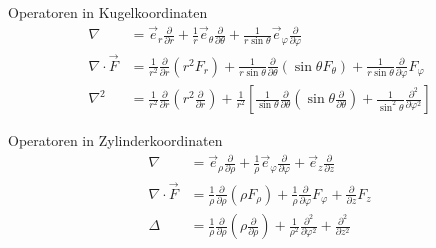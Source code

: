 Operatoren in Kugelkoordinaten
\begin{align*}
	\nabla            & =\vec e_r \frac{\partial}{\partial r}+\frac{1}{r}\vec e_\theta \frac{\partial}{\partial \theta} + \frac{1}{r\sin\theta}\vec e_\varphi \frac{\partial}{\partial\varphi}                                                                                                                    \\
	\nabla\cdot\vec F & = \frac{1}{r^2} \frac{\partial}{\partial r} (r^2 F_r)+ \frac{1}{r \sin\theta} \frac{\partial}{\partial\theta}(\sin\theta F_\theta)+\frac{1}{r\sin\theta} \frac{\partial}{\partial\varphi}F_\varphi                                                                                        \\
	\nabla^2          & =\frac{1}{r^2} \frac{\partial}{\partial r}\left(r^2 \frac{\partial}{\partial r}\right) +\frac{1}{r^2}\left[ \frac{1}{\sin\theta} \frac{\partial}{\partial\theta}\left(\sin\theta \frac{\partial}{\partial\theta}\right)+\frac{1}{\sin^2\theta}\frac{\partial^2}{\partial\varphi^2}\right]
\end{align*}

Operatoren in Zylinderkoordinaten
\begin{align*}
	\nabla             & = \vec e_\rho \frac{\partial}{\partial\rho} + \frac{1}{\rho}\vec e_\varphi \frac{\partial}{\partial\varphi}+\vec e_z \frac{\partial}{\partial z}                                    \\
	\nabla\cdot \vec F & = \frac{1}{\rho} \frac{\partial}{\partial\rho} \left(\rho F_\rho\right) + \frac{1}{\rho} \frac{\partial}{\partial\varphi}F_\varphi + \frac{\partial}{\partial z} F_z                \\
	\Delta             & = \frac{1}{\rho} \frac{\partial}{\partial\rho} \left(\rho \frac{\partial}{\partial\rho}\right)+\frac{1}{\rho^2}\frac{\partial^2}{\partial\varphi^2}+\frac{\partial^2}{\partial z^2}
\end{align*}
